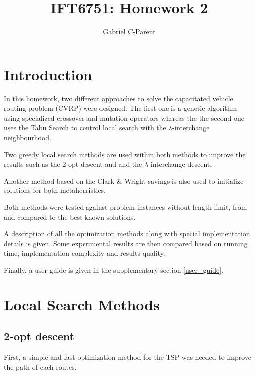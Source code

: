 \documentclass{article} %
\author{
Gabriel C-Parent\\
}
\begin{document}
\title{IFT6751: Homework 2}
      
\maketitle
\section{Introduction}

In this homework, two different approaches to solve the capacitated vehicle routing problem (CVRP) were designed. The first one is a genetic algorithm using specialized crossover and mutation operators whereas the the second one uses the Tabu Search to control local search with the $\lambda$-interchange neighbourhood.\newline

Two greedy local search methods are used within both methods to improve the results such as the 2-opt descent and  and the $\lambda$-interchange descent.\newline

Another method based on the Clark \& Wright savings is also used to initialize solutions for both metaheuristics.\newline


Both methods were tested against problem instances without length limit, from \citep{christofides} and compared to the best known solutions.\newline


A description of all the optimization methods along with special implementation details is given.
Some experimental results are then compared based on running time, implementation complexity and results quality.\newline

Finally, a user guide is given in the supplementary section \ref{user_guide}.



\newpage
\section{Local Search Methods}
\label{local_search}


\subsection{2-opt descent}
\label{local_tsp}

First, a simple and fast optimization method for the TSP was needed to improve the path of each routes.\newline
\end{document}
